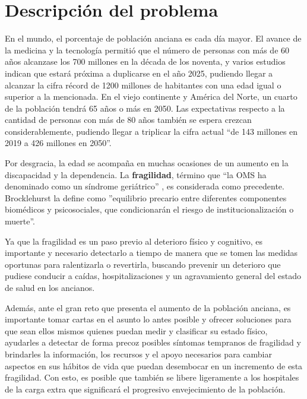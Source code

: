 \chapter{Descripción del problema}
\label{ch:descripcion}

En el mundo, el porcentaje de población anciana es cada día mayor. El avance de la medicina y la tecnología permitió que el número de personas con más de 60 años alcanzase los 700 millones en la década de los noventa, y varios estudios indican que estará próxima a duplicarse en el año 2025, pudiendo llegar a alcanzar la cifra récord de 1200 millones de habitantes con una edad igual o superior a la mencionada\cite{EPFAM}.  En el viejo continente y América del Norte, un cuarto de la población tendrá 65 años o más en 2050. Las expectativas respecto a la cantidad de personas con más de 80 años también se espera crezcan considerablemente, pudiendo llegar a triplicar la cifra actual ``de 143 millones en 2019 a 426 millones en 2050''\cite{envejecimiento}. 

Por desgracia, la edad se acompaña en muchas ocasiones de un aumento en la discapacidad y la dependencia. La \textbf{fragilidad}, término que ``la OMS ha denominado como un síndrome geriátrico'' \cite[Pag 1]{FA}, es considerada como precedente. Brocklehurst\cite{Brocklehurst} la define como ''equilibrio precario entre diferentes componentes biomédicos y psicosociales, que condicionarán el riesgo de institucionalización o muerte''\cite{HervasGarcia}.

Ya que la fragilidad es un paso previo al deterioro físico y cognitivo, es importante y necesario detectarlo a tiempo de manera que se tomen las medidas oportunas para ralentizarla o revertirla, buscando prevenir un deterioro que pudiese conducir a caídas, hospitalizaciones y un agravamiento general del estado de salud en los ancianos. 

Además, ante el gran reto que presenta el aumento de la población anciana, es importante tomar cartas en el asunto lo antes posible y ofrecer soluciones para que sean ellos mismos quienes puedan medir y clasificar su estado físico, ayudarles a detectar de forma precoz posibles síntomas tempranos de fragilidad y brindarles la información, los recursos y el apoyo necesarios para cambiar aspectos en sus hábitos de vida que puedan desembocar en un incremento de esta fragilidad. Con esto, es posible que también se libere ligeramente a los hospitales de la carga extra que significará el progresivo envejecimiento de la población.
